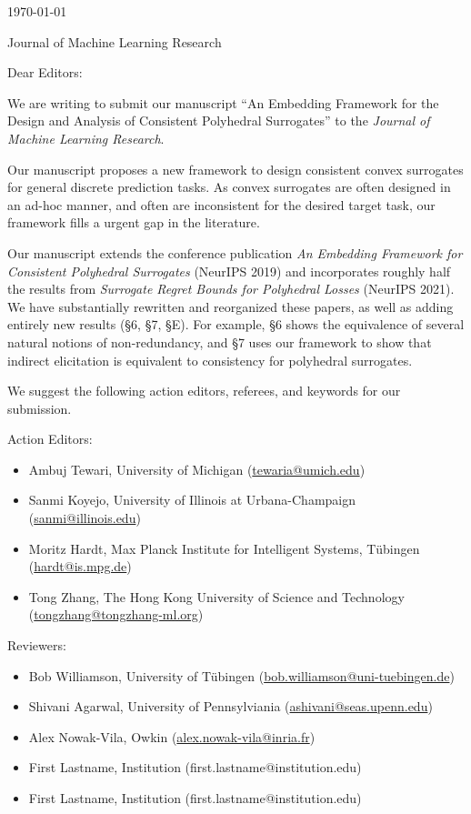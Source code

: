


\hfill{\today}

Journal of Machine Learning Research

\bigskip

Dear Editors:

We are writing to submit our manuscript ``An Embedding Framework for the Design and Analysis of Consistent Polyhedral Surrogates'' to the \emph{Journal of Machine Learning Research}.

Our manuscript proposes a new framework to design consistent convex surrogates for general discrete prediction tasks.
As convex surrogates are often designed in an ad-hoc manner, and often are inconsistent for the desired target task, our framework fills a urgent gap in the literature.

Our manuscript extends the conference publication \emph{An Embedding Framework for Consistent Polyhedral Surrogates} (NeurIPS 2019) and incorporates roughly half the results from \emph{Surrogate Regret Bounds for Polyhedral Losses} (NeurIPS 2021).
We have substantially rewritten and reorganized these papers, as well as adding entirely new results (\S 6, \S 7, \S E).
For example, \S 6 shows the equivalence of several natural notions of non-redundancy, and \S 7 uses our framework to show that indirect elicitation is equivalent to consistency for polyhedral surrogates.

We suggest the following action editors, referees, and keywords for our submission.

Action Editors:
\begin{itemize}
    \item Ambuj Tewari, University of Michigan (\url{tewaria@umich.edu})
    \item Sanmi Koyejo, University of Illinois at Urbana-Champaign (\url{sanmi@illinois.edu})
    \item Moritz Hardt, Max Planck Institute for Intelligent Systems, T\"ubingen (\url{hardt@is.mpg.de})
    \item Tong Zhang,  The Hong Kong University of Science and Technology (\url{tongzhang@tongzhang-ml.org})
\end{itemize}

Reviewers:
\begin{itemize}
    \item Bob Williamson, University of T\"ubingen (\url{bob.williamson@uni-tuebingen.de})
    \item Shivani Agarwal, University of Pennsylviania (\url{ashivani@seas.upenn.edu})
    \item Alex Nowak-Vila, Owkin (\url{alex.nowak-vila@inria.fr})
    \item First Lastname, Institution (first.lastname@institution.edu)
    \item First Lastname, Institution (first.lastname@institution.edu)
\end{itemize}


